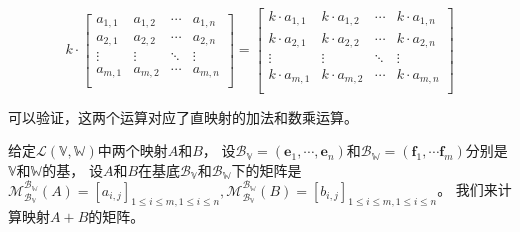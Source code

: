 \documentclass[12pt,UTF8,fontset=none]{ctexbook}
\begin{document}
$$
    k\cdot\begin{bmatrix}
     a_{1,1}     & a_{1,2}   & \cdots & a_{1,n} \\
     a_{2,1}     & a_{2,2}   & \cdots & a_{2,n} \\
     \vdots      & \vdots    & \ddots & \vdots  \\
     a_{m,1}     & a_{m,2}   & \cdots & a_{m,n} \\
    \end{bmatrix}
    =
    \begin{bmatrix}
        k\cdot a_{1,1}     & k\cdot a_{1,2}   & \cdots & k\cdot a_{1,n} \\
        k\cdot a_{2,1}     & k\cdot a_{2,2}   & \cdots & k\cdot a_{2,n} \\
        \vdots      & \vdots    & \ddots & \vdots  \\
        k\cdot a_{m,1}     & k\cdot a_{m,2}   & \cdots & k\cdot a_{m,n} \\
    \end{bmatrix} 
$$

可以验证，这两个运算对应了直映射的加法和数乘运算。

给定$\mathcal{L}(\mathbb{V}, \mathbb{W})$中两个映射$A$和$B$，
设$\mathcal{B}_\mathbb{V} = (\mathbf{e}_1, \cdots, \mathbf{e}_n)$和$\mathcal{B}_\mathbb{W} = (\mathbf{f}_1, \cdots \mathbf{f}_m)$分别是$\mathbb{V}$和$\mathbb{W}$的基，
设$A$和$B$在基底$\mathcal{B}_\mathbb{V}$和$\mathcal{B}_\mathbb{W}$下的矩阵是
$\mathcal{M}_{\mathcal{B}_\mathbb{V}}^{\mathcal{B}_\mathbb{W}}(A) = [a_{i,j}]_{1\leqslant i\leqslant m, 1\leqslant i\leqslant n}, \mathcal{M}_{\mathcal{B}_\mathbb{V}}^{\mathcal{B}_\mathbb{W}}(B) = [b_{i,j}]_{1\leqslant i\leqslant m, 1\leqslant i\leqslant n}$。
我们来计算映射$A+B$的矩阵。
\end{document}
